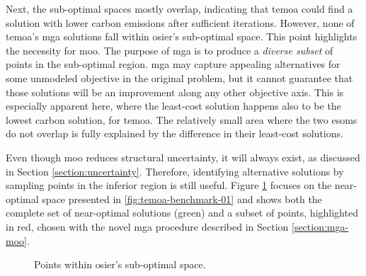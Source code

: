Next, the sub-optimal spaces mostly overlap, indicating that \ac{temoa} could
find a solution with lower carbon emissions after sufficient iterations.
However, none of \ac{temoa}'s \ac{mga} solutions fall within \ac{osier}'s
sub-optimal space. This point highlights the necessity for \acl{moo}. The
purpose of \ac{mga} is to produce a \textit{diverse subset} of points in the
sub-optimal region. \ac{mga} may capture appealing alternatives for some
unmodeled objective in the original problem, but it cannot guarantee that those
solutions will be an improvement along any other objective axis. This is
especially apparent here, where the least-cost solution happens also to be the
lowest carbon solution, for \ac{temoa}. The relatively small area where the two
\acp{esom} do not overlap is fully explained by the difference in their
least-cost solutions.

Even though \ac{moo} reduces structural uncertainty, it will always exist, as
discussed in Section \ref{section:uncertainty}. Therefore, identifying
alternative solutions by sampling points in the inferior region is still useful.
Figure \ref{fig:temoa-benchmark-02} focuses on the near-optimal space presented
in \ref{fig:temoa-benchmark-01} and shows both the complete set of near-optimal
solutions (green) and a subset of points, highlighted in red, chosen with the
novel \ac{mga} procedure described in Section \ref{section:mga-moo}.

\begin{figure}[h]
  \centering
  \resizebox{0.75\columnwidth}{!}{}
  \caption{Points within \ac{osier}'s sub-optimal space.}
  \label{fig:temoa-benchmark-02}
\end{figure}

